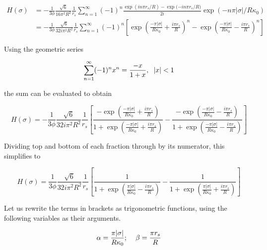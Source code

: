 \documentclass[onecolumn]{aastex63}
\begin{document}
\begin{equation}
    \begin{split}
        H(\sigma) &= - \frac{1}{3 \phi} \frac{\sqrt{6}}{16 \pi^2 R^2} \frac{1}{r_s} \sum_{n=1}^{\infty} (-1)^n \frac{\exp{(in\pi r_s / R)}-\exp{(-in\pi r_s/R})}{2i} \exp{(-n \pi |\sigma|/R\kappa_0)} \\
        &= - \frac{1}{3 \phi} \frac{\sqrt{6}}{32 i \pi^2 R^2} \frac{1}{r_s} \sum_{n=1}^{\infty} (-1)^n \left[ \exp{\left(\frac{-\pi |\sigma|}{R\kappa_0} + \frac{i\pi r_s}{R}\right)^n}-\exp{\left(\frac{-\pi |\sigma|}{R\kappa_0} - \frac{i\pi r_s}{R}\right)^n}\right]
    \end{split}
\end{equation}

Using the geometric series

\begin{equation}
    \sum_{n=1}^{\infty}(-1)^nx^n = \frac{-x}{1+x}, \hspace{0.2cm} |x| < 1
\end{equation}

the sum can be evaluated to obtain

\begin{equation}
    H(\sigma) = - \frac{1}{3 \phi} \frac{\sqrt{6}}{32 i \pi^2 R^2} \frac{1}{r_s} \left[\frac{-\exp{\left(\frac{-\pi |\sigma|}{R\kappa_0} + \frac{i\pi r_s}{R}\right)}}{1 + \exp{\left(\frac{-\pi |\sigma|}{R\kappa_0} + \frac{i\pi r_s}{R}\right)}}-\frac{-\exp{\left(\frac{-\pi |\sigma|}{R\kappa_0} - \frac{i\pi r_s}{R}\right)}}{1 + \exp{\left(\frac{-\pi |\sigma|}{R\kappa_0} - \frac{i\pi r_s}{R}\right)}}\right]
\end{equation}

Dividing top and bottom of each fraction through by its numerator, this simplifies to

\begin{equation} \label{before_trig}
    H(\sigma) = \frac{1}{3 \phi} \frac{\sqrt{6}}{32 i \pi^2 R^2} \frac{1}{r_s} \left[\frac{1}{1 + \exp{\left(\frac{\pi |\sigma|}{R\kappa_0} - \frac{i\pi r_s}{R}\right)}}-\frac{1}{1 + \exp{\left(\frac{\pi |\sigma|}{R\kappa_0} + \frac{i\pi r_s}{R}\right)}}\right]
\end{equation}

Let us rewrite the terms in brackets as trigonometric functions, using the following variables as their arguments.

\begin{equation}
    \alpha = \frac{\pi |\sigma|}{R\kappa_0}; \hspace{0.4cm} \beta = \frac{\pi r_s}{R}
\end{equation}
\end{document}
